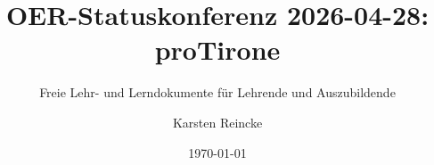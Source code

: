 \documentclass[]{beamer}
\title{OER-Statuskonferenz 2026-04-28: proTirone}
\subtitle{Freie Lehr- und Lerndokumente für Lehrende und Auszubildende}
\institute[GS-LDK]{Gewerbliche Schulen Dillenburg}
\author{Karsten Reincke}
\date{\today}
\def\cfgGl{../../../cfg.gl/}
\begin{document}

\begin{frame}
  \titlepage

  
\end{frame}






\logo{}
\newpage




\end{document}
